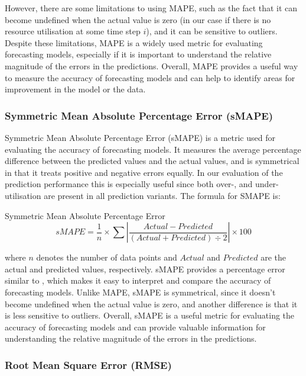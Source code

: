       However, there are some limitations to using MAPE, such as the fact that it can become undefined when the actual value is zero (in our case if there is no resource utilisation at some time step $i$), and it can be sensitive to outliers.
      Despite these limitations, MAPE is a widely used metric for evaluating forecasting models, especially if it is important to understand the relative magnitude of the errors in the predictions. 
      Overall, MAPE provides a useful way to measure the accuracy of forecasting models and can help to identify areas for improvement in the model or the data.


    \subsubsection{Symmetric Mean Absolute Percentage Error (sMAPE)}
    \label{sec:smape-metrics-evaluation}
    
      Symmetric Mean Absolute Percentage Error (sMAPE) \cite{kreinovichHowEstimateForecasting2014} is a metric used for evaluating the accuracy of forecasting models. It measures the average percentage difference between the predicted values and the actual values, and is symmetrical in that it treats positive and negative errors equally.
      In our evaluation of the prediction performance this is especially useful since both over-, and under-utilisation are present in all prediction variants.
      The formula for SMAPE is:

      \begin{pabox}{Symmetric Mean Absolute Percentage Error}
        $$sMAPE = \frac{1}{n} \times \sum \left|\frac{Actual - Predicted}{\left(Actual + Predicted\right) \div 2}\right| \times 100$$
      \end{pabox}
      where $n$ denotes the number of data points and $Actual$ and $Predicted$ are the actual and predicted values, respectively.
      sMAPE provides a percentage error similar to , which makes it easy to interpret and compare the accuracy of forecasting models. Unlike MAPE, sMAPE is symmetrical, since it doesn't become undefined when the actual value is zero, and another difference is that it is less sensitive to outliers.
      Overall, sMAPE is a useful metric for evaluating the accuracy of forecasting models and can provide valuable information for understanding the relative magnitude of the errors in the predictions.

    \subsubsection{Root Mean Square Error (RMSE)}
    \label{sec:rmse-metrics-evaluation}

